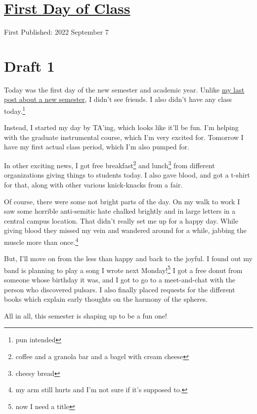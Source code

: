 \documentclass[12pt]{article}[titlepage]
\newcommand{\1}{\={a}}
\newcommand{\2}{\={e}}
\newcommand{\3}{\={\i}}
\newcommand{\4}{\=o}
\newcommand{\5}{\=u}
\newcommand{\6}{\={A}}
\renewcommand{\,}{\textsuperscript{,}}
\begin{document}
\doublespacing
\section{\href{first-day-of-class-F2022.html}{First Day of Class}}
First Published: 2022 September 7

\section{Draft 1}
Today was the first day of the new semester and academic year.
Unlike \href{first-day-of-class-S2022.html}{my last post about a new semester}, I didn't see friends.
I also didn't have any class today.\footnote{pun intended}

Instead, I started my day by TA'ing, which looks like it'll be fun.
I'm helping with the graduate instrumental course, which I'm very excited for.
Tomorrow I have my first actual class period, which I'm also pumped for.

In other exciting news, I got free breakfast\footnote{coffee and a granola bar and a bagel with cream cheese} and lunch\footnote{cheesy bread} from different organizations giving things to students today.
I also gave blood, and got a t-shirt for that, along with other various knick-knacks from a fair.

Of course, there were some not bright parts of the day.
On my walk to work I saw some horrible anti-semitic hate chalked brightly and in large letters in a central campus location.
That didn't really set me up for a happy day.
While giving blood they missed my vein and wandered around for a while, jabbing the muscle more than once.\footnote{my arm still hurts and I'm not sure if it's supposed to.}

But, I'll move on from the less than happy and back to the joyful.
I found out my band is planning to play a song I wrote next Monday!\footnote{now I need a title}
I got a free donut from someone whose birthday it was, and I got to go to a meet-and-chat with the person who discovered pulsars.
I also finally placed requests for the different books which explain early thoughts on the harmony of the spheres.

All in all, this semester is shaping up to be a fun one!
\end{document}
